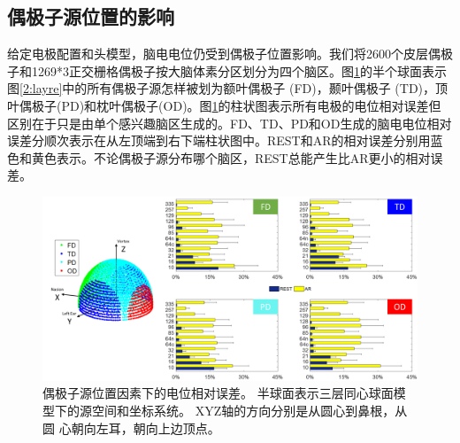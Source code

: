 \subsection{偶极子源位置的影响}
给定电极配置和头模型，脑电电位仍受到偶极子位置影响。我们将2600个皮层偶极子和1269*3正交栅格偶极子按大脑体素分区划分为四个脑区。图\ref{2:dip}的半个球面表示图\ref{2:layre}中的所有偶极子源怎样被划为额叶偶极子 (FD)，颞叶偶极子 (TD)，顶叶偶极子(PD)和枕叶偶极子(OD)。图\ref{2:dip}的柱状图表示所有电极的电位相对误差但区别在于只是由单个感兴趣脑区生成的。FD、TD、PD和OD生成的脑电电位相对误差分顺次表示在从左顶端到右下端柱状图中。REST和AR的相对误差分别用蓝色和黄色表示。不论偶极子源分布哪个脑区，REST总能产生比AR更小的相对误差。
\begin{figure}[h!]
	\centering
	\includegraphics[width=15cm]{pic/JNE/figure6.png}
	\caption{偶极子源位置因素下的电位相对误差。 半球面表示三层同心球面模型下的源空间和坐标系统。 XYZ轴的方向分别是从圆心到鼻根，从圆
	心朝向左耳，朝向上边顶点。}
	\label{2:dip}
\end{figure}

